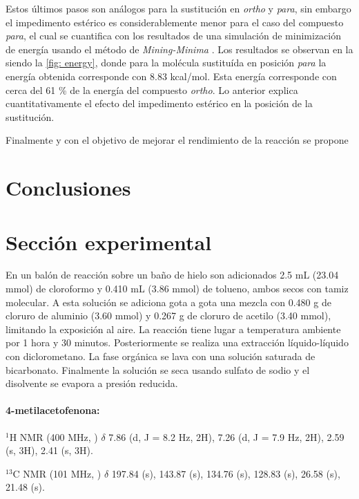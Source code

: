\documentclass[fleqn,11pt]{SelfArx}
\begin{document}
Estos últimos pasos son análogos para la sustitución en \textit{ortho} y \textit{para}, sin embargo el impedimento estérico es considerablemente menor para el caso del compuesto \textit{para}, el cual se cuantifica con los resultados de una simulación de minimización de energía usando el método de \textit{Mining-Minima} \cite{Huang2012}. Los resultados se observan en la siendo la \autoref{fig: energy}, donde para la molécula sustituída en posición \textit{para} la energía obtenida corresponde con 8.83 kcal/mol. Esta energía corresponde con cerca del 61 \% de la energía del compuesto \textit{ortho}. Lo anterior explica cuantitativamente el efecto del impedimento estérico en la posición de la sustitución.

Finalmente y con el objetivo de mejorar el rendimiento de la reacción se propone 
\newpage

\section{Conclusiones}

\section{Secci\'on experimental}
En un balón de reacción sobre un baño de hielo son adicionados 2.5 mL (23.04 mmol) de cloroformo y 0.410 mL (3.86 mmol) de tolueno, ambos secos con tamiz molecular. A esta solución se adiciona gota a gota una mezcla con 0.480 g de cloruro de aluminio (3.60 mmol) y 0.267 g de cloruro de acetilo (3.40 mmol), limitando la exposición al aire. La reacción tiene lugar a temperatura ambiente por 1 hora y 30 minutos. Posteriormente se realiza una extracción líquido-líquido con diclorometano. La fase orgánica se lava con una solución saturada de bicarbonato. Finalmente la solución se seca usando sulfato de sodio y el disolvente se evapora a presión reducida.

\paragraph{4-metilacetofenona:}
$^1$H NMR (400 MHz, ) $\delta$ 7.86 (d, J = 8.2 Hz, 2H), 7.26 (d, J = 7.9 Hz, 2H), 2.59 (s, 3H), 2.41 (s, 3H).

$^{13}$C NMR (101 MHz, ) $\delta$ 197.84 (s), 143.87 (s), 134.76 (s), 128.83 (s), 26.58 (s), 21.48 (s).

{}


\end{document}
